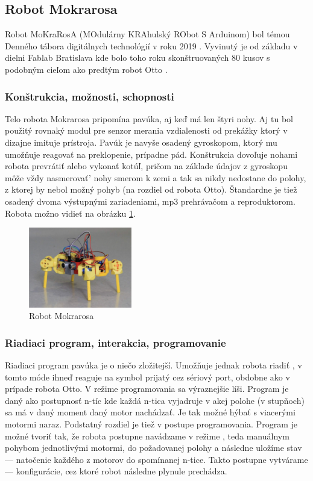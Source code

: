 \newpage

\subsection{Robot Mokrarosa}
Robot MoKraRosA (MOdulárny KRAhulský RObot S Arduinom) bol témou Denného tábora digitálnych technológií v roku 2019 \cite{PetrovicVaskoMokrarosa}. Vyvinutý je od základu v dielni Fablab Bratislava kde bolo toho roku skonštruovaných 80 kusov s podobným cieľom ako predtým robot Otto \cite{Mokrarosa}.

\subsubsection{Konštrukcia, možnosti, schopnosti}
Telo robota Mokrarosa pripomína pavúka, aj keď má len štyri nohy. Aj tu bol použitý rovnaký modul pre senzor merania vzdialenosti od prekážky ktorý v dizajne imituje  prístroja. Pavúk je navyše osadený gyroskopom, ktorý mu umožňuje reagovať na preklopenie, prípadne pád. Konštrukcia dovoľuje nohami robota prevrátiť alebo vykonať kotúľ, pričom na základe údajov z gyroskopu môže vždy nasmerovať' nohy smerom k zemi a tak sa nikdy nedostane do polohy, z ktorej by nebol možný pohyb (na rozdiel od robota Otto). Štandardne je tiež osadený dvoma výstupnými zariadeniami, mp3 prehrávačom a reproduktorom. Robota možno vidieť na obrázku \ref{obr:mokrarosa}.

\begin{figure}
\centerline{\includegraphics[width=0.4\textwidth]{images/mokrarosa}}
\caption[Robot Mokrarosa]{Robot Mokrarosa}
\label{obr:mokrarosa}
\end{figure}

\subsubsection{Riadiaci program, interakcia, programovanie}
Riadiaci program pavúka je o niečo zložitejší. Umožňuje jednak robota riadiť , v tomto móde ihneď reaguje na symbol prijatý cez sériový port, obdobne ako v prípade robota Otto. V režime programovania sa výraznejšie líši. Program je daný ako postupnosť n-tíc kde každá n-tica vyjadruje v akej polohe (v stupňoch) sa má v daný moment daný motor nachádzať. Je tak možné hýbať s viacerými motormi naraz. Podstatný rozdiel je tiež v postupe programovania. Program je možné tvoriť tak, že robota postupne navádzame v režime , teda manuálnym pohybom jednotlivými motormi, do požadovanej polohy a následne uložíme stav --- natočenie každého z motorov do spomínanej n-tice. Takto postupne vytvárame  --- konfigurácie, cez ktoré robot následne plynule prechádza.


